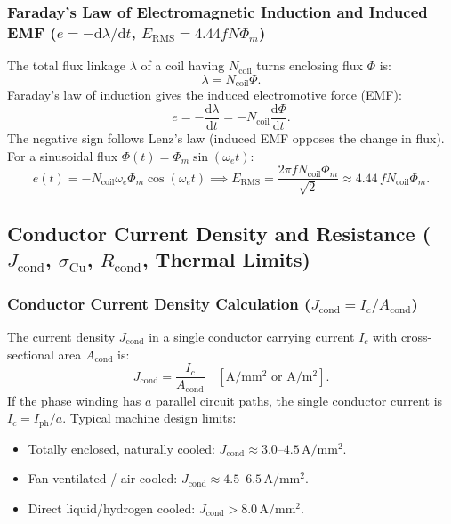 \subsubsection{Faraday's Law of Electromagnetic Induction and Induced EMF ($e = -\mathrm{d}\lambda/\mathrm{d}t$, $E_{\mathrm{RMS}} = 4.44 f N \Phi_m$)}
The total flux linkage $\lambda$ of a coil having $N_{\mathrm{coil}}$ turns enclosing flux $\Phi$ is:
\[
\lambda = N_{\mathrm{coil}}\Phi.
\]
Faraday's law of induction gives the induced electromotive force (EMF):
\[
e = -\frac{\mathrm{d}\lambda}{\mathrm{d}t} = -N_{\mathrm{coil}}\frac{\mathrm{d}\Phi}{\mathrm{d}t}.
\]
The negative sign follows Lenz's law (induced EMF opposes the change in flux).
For a sinusoidal flux $\Phi(t) = \Phi_m \sin(\omega_e t)$:
\[
e(t) = -N_{\mathrm{coil}}\omega_e \Phi_m \cos(\omega_e t)
\implies
E_{\mathrm{RMS}} = \frac{2\pi f N_{\mathrm{coil}}\Phi_m}{\sqrt{2}} \approx 4.44\,f N_{\mathrm{coil}}\Phi_m.
\]

\subsection{Conductor Current Density and Resistance ($J_{\mathrm{cond}}$, $\sigma_{\mathrm{Cu}}$, $R_{\mathrm{cond}}$, Thermal Limits)}

\subsubsection{Conductor Current Density Calculation ($J_{\mathrm{cond}} = I_c / A_{\mathrm{cond}}$)}
The current density $J_{\mathrm{cond}}$ in a single conductor carrying current $I_c$ with cross-sectional area $A_{\mathrm{cond}}$ is:
\[
J_{\mathrm{cond}} = \frac{I_c}{A_{\mathrm{cond}}}\quad[\mathrm{A/mm^2}\text{ or }\mathrm{A/m^2}].
\]
If the phase winding has $a$ parallel circuit paths, the single conductor current is $I_c = I_{\mathrm{ph}} / a$.
Typical machine design limits:
\begin{itemize}
  \item Totally enclosed, naturally cooled: $J_{\mathrm{cond}} \approx 3.0\text{--}4.5\,\mathrm{A/mm^2}$.
  \item Fan-ventilated / air-cooled: $J_{\mathrm{cond}} \approx 4.5\text{--}6.5\,\mathrm{A/mm^2}$.
  \item Direct liquid/hydrogen cooled: $J_{\mathrm{cond}} > 8.0\,\mathrm{A/mm^2}$.
\end{itemize}

